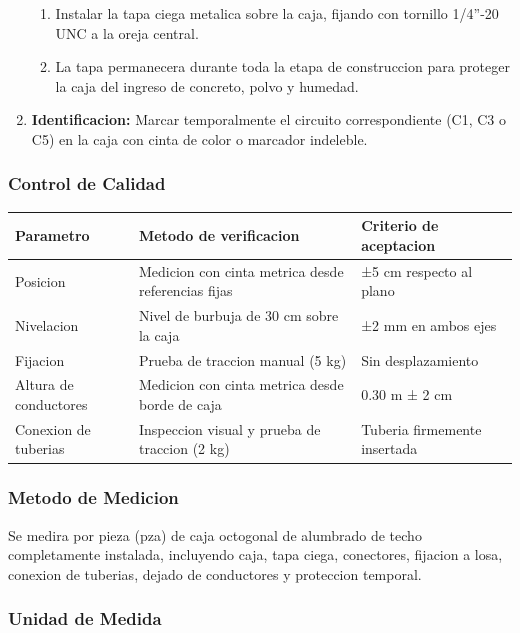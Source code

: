 \begin{enumerate}
  \begin{enumerate}
    \item Instalar la tapa ciega metalica sobre la caja, fijando con tornillo 1/4''-20 UNC a la oreja central.
    \item La tapa permanecera durante toda la etapa de construccion para proteger la caja del ingreso de concreto, polvo y humedad.
  \end{enumerate}
  \item \textbf{Identificacion:} Marcar temporalmente el circuito correspondiente (C1, C3 o C5) en la caja con cinta de color o marcador indeleble.
\end{enumerate}

\subsubsection{Control de Calidad}

\begin{longtable}{L{4.5cm} L{4.5cm} L{4.5cm}}
\toprule
\textbf{Parametro} & \textbf{Metodo de verificacion} & \textbf{Criterio de aceptacion} \\
\midrule
Posicion & Medicion con cinta metrica desde referencias fijas & ±5 cm respecto al plano \\
Nivelacion & Nivel de burbuja de 30 cm sobre la caja & ±2 mm en ambos ejes \\
Fijacion & Prueba de traccion manual (5 kg) & Sin desplazamiento \\
Altura de conductores & Medicion con cinta metrica desde borde de caja & 0.30 m ± 2 cm \\
Conexion de tuberias & Inspeccion visual y prueba de traccion (2 kg) & Tuberia firmemente insertada \\
\bottomrule
\end{longtable}

\subsubsection{Metodo de Medicion}

Se medira por pieza (pza) de caja octogonal de alumbrado de techo completamente instalada, incluyendo caja, tapa ciega, conectores, fijacion a losa, conexion de tuberias, dejado de conductores y proteccion temporal.

\subsubsection{Unidad de Medida}

